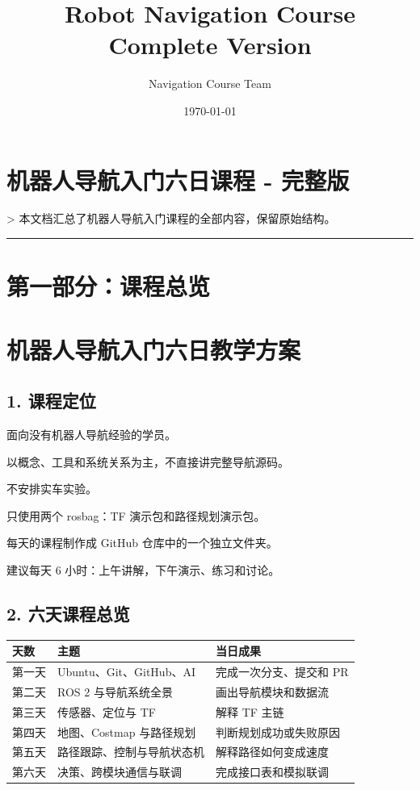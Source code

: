 \documentclass[a4paper,12pt]{book}
\title{\Huge\textbf{Robot Navigation Course}\\[0.5cm]\Large Complete Version}
\author{Navigation Course Team}
\date{\today}
\begin{document}
\maketitle
\tableofcontents
\newpage

\chapter{机器人导航入门六日课程 - 完整版}

> 本文档汇总了机器人导航入门课程的全部内容，保留原始结构。

\noindent\rule{\textwidth}{1pt}


\chapter{第一部分：课程总览}

\chapter{机器人导航入门六日教学方案}

\section{1. 课程定位}

\item 面向没有机器人导航经验的学员。
\item 以概念、工具和系统关系为主，不直接讲完整导航源码。
\item 不安排实车实验。
\item 只使用两个 rosbag：TF 演示包和路径规划演示包。
\item 每天的课程制作成 GitHub 仓库中的一个独立文件夹。
\item 建议每天 6 小时：上午讲解，下午演示、练习和讨论。

\section{2. 六天课程总览}

\begin{table}[h]
\centering
\small
\begin{tabular}{|l|l|l|}
\hline
天数 & 主题 & 当日成果 \\
\hline
第一天 & Ubuntu、Git、GitHub、AI & 完成一次分支、提交和 PR \\
\hline
第二天 & ROS 2 与导航系统全景 & 画出导航模块和数据流 \\
\hline
第三天 & 传感器、定位与 TF & 解释 TF 主链 \\
\hline
第四天 & 地图、Costmap 与路径规划 & 判断规划成功或失败原因 \\
\hline
第五天 & 路径跟踪、控制与导航状态机 & 解释路径如何变成速度 \\
\hline
第六天 & 决策、跨模块通信与联调 & 完成接口表和模拟联调 \\
\hline
\end{tabular}
\end{table}
\end{document}
